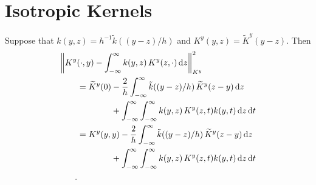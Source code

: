 \documentclass{amsart}
\newcommand{\KY}{K^y}
\newcommand{\tKY}{\widetilde{K}^y}
\newcommand{\tk}{\tilde{k}}
\begin{document}
\section{Isotropic Kernels}

Suppose that $k(y,z) = h^{-1}\tk((y-z)/h)$ and $\KY(y,z) = \tKY(y-z)$.  Then
\begin{align*}
\MoveEqLeft{\norm[\KY]{\KY(\cdot,y) - \int_{-\infty}^{\infty} k(y,z) \, \KY(z,\cdot) \, \dif z}^2} \\
&=  \tKY(0) -  \frac 2h \int_{-\infty}^{\infty} \tk((y-z)/h) \, \tKY(z-y) \, \dif z \\
& \qquad \qquad + \int_{-\infty}^{\infty} \int_{-\infty}^{\infty}  k(y,z) \, \KY(z,t) k(y,t)\, \dif z \, \dif t \\
&=  \KY(y,y) -  \frac 2h \int_{-\infty}^{\infty} \tk((y-z)/h) \, \tKY(z-y) \, \dif z \\
& \qquad \qquad + \int_{-\infty}^{\infty} \int_{-\infty}^{\infty}  k(y,z) \, \KY(z,t) k(y,t)\, \dif z \, \dif t \\
.
\end{align*}


\end{document}
